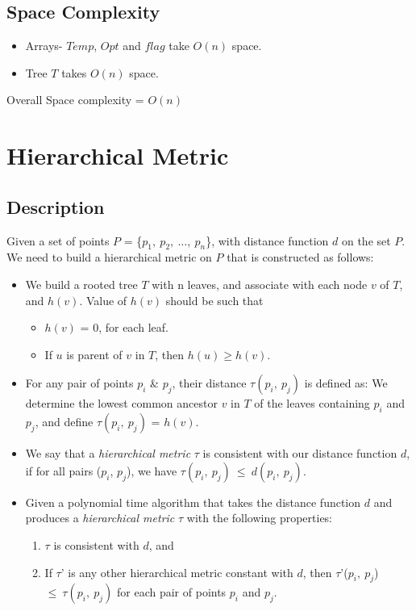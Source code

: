 \documentclass[pdftex,a4paper,12pt]{report}
\begin{document}
\subsection{Space Complexity}
\begin{itemize}
\item Arrays- $Temp$, $Opt$ and $flag$ take $O(n)$ space.
\item Tree $T$ takes $O(n)$ space.
\end{itemize}
\begin{center}
Overall Space complexity = $O(n)$
\end{center}
\newpage


\section{Hierarchical Metric}
	\subsection{Description}
	Given a set of points $P$ = \{$p_1,\ p_2,\ \ldots, \ p_n$\}, with distance function $d$ on the
	set $P$.\\
	
	We need to build a hierarchical metric on $P$ that is constructed as follows:
	\begin{itemize}
		\item
		We build a rooted tree $T$ with n leaves, and associate with each node $v$ of $T$, 
		and $h(v)$. Value of $h(v)$ should be such that
			\begin{itemize}
				\item $h(v)$ = 0, for each leaf.
				\item If $u$ is parent of $v$ in $T$, then $h(u) \geq  h(v) $.
			\end{itemize}
		\item
		For any pair of points $p_i$ \& $p_j$, their distance $\tau (p_i,\ p_j)$ is defined as:
		We determine the lowest common ancestor $v$ in $T$ of the leaves containing $p_i$ and 
		$p_j$, and define $\tau (p_i,\ p_j)$ = $h(v)$.
		\item
		We say that a \emph{hierarchical metric} $\tau$ is consistent with our distance function
		$d$, if for all pairs ($p_i$, $p_j$), we have $\tau(p_i,\ p_j)\ \leq\ d(p_i,\ p_j)$.
		\item
		Given a polynomial time algorithm that takes the distance function $d$ and produces
		a \emph{hierarchical metric} $\tau$ with the following properties:
			\begin{enumerate}
				\item
				$\tau$ is consistent with $d$, and
				\item
				If $\tau$' is any other hierarchical metric constant with $d$, then $\tau$'($p_i,\ p_j$) $\leq\ \tau(p_i,\ p_j)$ 
				for each pair of points $p_i$ and $p_j$.
			\end{enumerate}
	\end{itemize}
\end{document}
